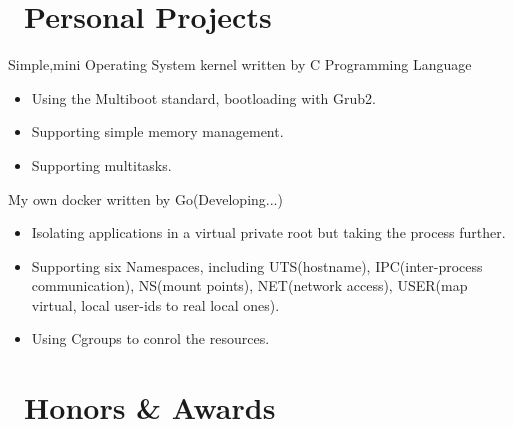 \documentclass{resume}
\begin{document}
\section{\faGithubAlt \ Personal Projects}


Simple,mini Operating System kernel written by C Programming Language
\begin{itemize}
  \item Using the Multiboot standard, bootloading with Grub2.
  \item Supporting simple memory management.
  \item Supporting multitasks.
\end{itemize}

My own docker written by Go(Developing...)
\begin{itemize}
  \item Isolating applications in a virtual private root but taking the process further.
  \item Supporting six Namespaces, including UTS(hostname), IPC(inter-process communication), NS(mount points), NET(network access), USER(map virtual, local user-ids to real local ones).
  \item Using Cgroups to conrol the resources. 
\end{itemize}

\section{\faHeartO\ Honors \& Awards}
\end{document}
